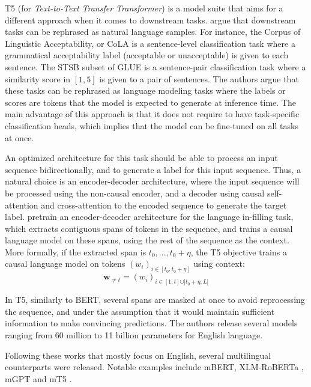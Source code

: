 T5 (for \textit{Text-to-Text Transfer Transformer}) is a model suite that aims for a different approach when it comes to downstream tasks. \citet{2020t5} argue that downstream tasks can be rephrased as natural language samples. For instance, the Corpus of Linguistic Acceptability, or CoLA \citep{warstadt2018neural} is a sentence-level classification task where a grammatical acceptability label (acceptable or unacceptable) is given to each sentence. The STSB subset of GLUE \citep{wang-etal-2018-glue} is a sentence-pair classification task where a similarity score in $[1, 5]$ is given to a pair of sentences. The authors argue that these tasks can be rephrased as language modeling tasks where the labels or scores are tokens that the model is expected to generate at inference time. The main advantage of this approach is that it does not require to have task-specific classification heads, which implies that the model can be fine-tuned on all tasks at once.

An optimized architecture for this task should be able to process an input sequence bidirectionally, and to generate a label for this input sequence. Thus, a natural choice is an encoder-decoder architecture, where the input sequence will be processed using the non-causal encoder, and a decoder using causal self-attention and cross-attention to the encoded sequence to generate the target label. \citet{2020t5} pretrain an encoder-decoder architecture for the language in-filling task, which extracts contiguous spans of tokens in the sequence, and trains a causal language model on these spans, using the rest of the sequence as the context. More formally, if the extracted span is $t_0, ..., t_0+\eta$, the T5 objective trains a causal language model on tokens $(w_i)_{i \in [t_0, t_0+\eta]}$ using context:
$$
\mathbf{w}_{\neq t} = (w_i)_{i \in [1, t] \cup ]t_0+\eta, L]}
$$

In T5, similarly to BERT, several spans are masked at once to avoid reprocessing the sequence, and under the assumption that it would maintain sufficient information to make convincing predictions. The authors release several models ranging from 60 million to 11 billion parameters for English language.

Following these works that mostly focus on English, several multilingual counterparts were released. Notable examples include mBERT, XLM-RoBERTa \citep{conneau2019unsupervised}, mGPT \citep{mgpt} and mT5 \citep{xue-etal-2021-mt5}.

